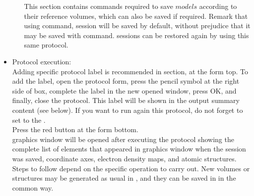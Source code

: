\begin{itemize}
\begin{itemize}
    This section contains \chimera commands required to save $models$ according to their reference volumes, which can also be saved if required. Remark that using  command, \chimera session will be saved by default, without prejudice that it may be saved with  command. \chimera sessions can be restored again by using this same  protocol.\\
    
    \end{itemize}

  \item Protocol execution:\\
  
  Adding specific protocol label is recommended in  section, at the form top. To add the label, open the protocol form, press the pencil symbol at the right side of  box, complete the label in the new opened window, press OK, and finally, close the protocol. This label will be shown in the output summary content (see below). If you want to run again this protocol, do not forget to set to  the .\\
  Press the  red button at the form bottom.\\
  
  \chimera graphics window will be opened after executing the protocol showing the complete list of elements that appeared in \chimera graphics window when the session was saved, coordinate axes, electron density maps, and atomic structures. Steps to follow depend on the specific operation to carry out. New volumes or structures may be generated as usual in \chimera, and they can be saved in \scipion in the common way.\\
  \begin{itemize}
   

\end{itemize}
\end{itemize}

